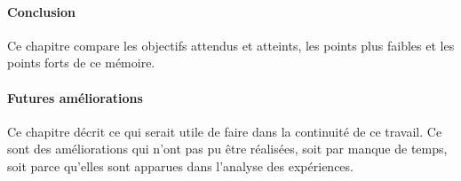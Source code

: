\paragraph{Conclusion}
Ce chapitre compare les objectifs attendus et atteints, les points plus faibles et les points forts de ce mémoire. %

\paragraph{Futures améliorations}
Ce chapitre décrit ce qui serait utile de faire dans la continuité de ce travail. Ce sont des améliorations qui n'ont pas pu être réalisées, soit par manque de temps, soit parce qu'elles sont apparues dans l'analyse des expériences.
